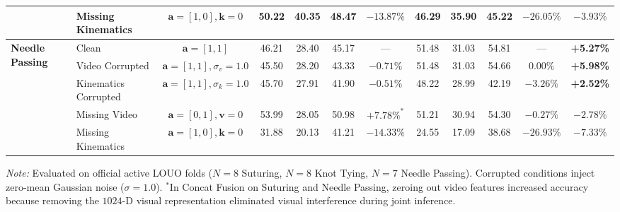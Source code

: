 \documentclass[10pt,journal]{IEEEtran}
\begin{document}
\begin{table}[t]
{\begin{tabular}{llcccccccccc}
& Missing Kinematics & $\mathbf{a} = [1, 0], \mathbf{k}=0$ & 50.22 & 40.35 & 48.47 & $-13.87\%$ & 46.29 & 35.90 & 45.22 & $-26.05\%$ & $-3.93\%$ \\
\midrule
\multirow{5}{*}{\textbf{Needle Passing}}
& Clean & $\mathbf{a} = [1, 1]$ & 46.21 & 28.40 & 45.17 & — & 51.48 & 31.03 & 54.81 & — & \textbf{+5.27\%} \\
& Video Corrupted & $\mathbf{a} = [1, 1], \sigma_v=1.0$ & 45.50 & 28.20 & 43.33 & $-0.71\%$ & 51.48 & 31.03 & 54.66 & $\mathbf{0.00\%}$ & \textbf{+5.98\%} \\
& Kinematics Corrupted & $\mathbf{a} = [1, 1], \sigma_k=1.0$ & 45.70 & 27.91 & 41.90 & $-0.51\%$ & 48.22 & 28.99 & 42.19 & $-3.26\%$ & \textbf{+2.52\%} \\
& Missing Video & $\mathbf{a} = [0, 1], \mathbf{v}=0$ & 53.99 & 28.05 & 50.98 & $+7.78\%^*$ & 51.21 & 30.94 & 54.30 & $\mathbf{-0.27\%}$ & $-2.78\%$ \\
& Missing Kinematics & $\mathbf{a} = [1, 0], \mathbf{k}=0$ & 31.88 & 20.13 & 41.21 & $-14.33\%$ & 24.55 & 17.09 & 38.68 & $-26.93\%$ & $-7.33\%$ \\
\bottomrule
\end{tabular}%
}
\vspace{2pt}
\par\noindent\footnotesize\textit{Note:} Evaluated on official active LOUO folds ($N=8$ Suturing, $N=8$ Knot Tying, $N=7$ Needle Passing). Corrupted conditions inject zero-mean Gaussian noise ($\sigma=1.0$). $^*$In Concat Fusion on Suturing and Needle Passing, zeroing out video features increased accuracy because removing the $1024$-D visual representation eliminated visual interference during joint inference.\par
\end{table}
\end{document}
